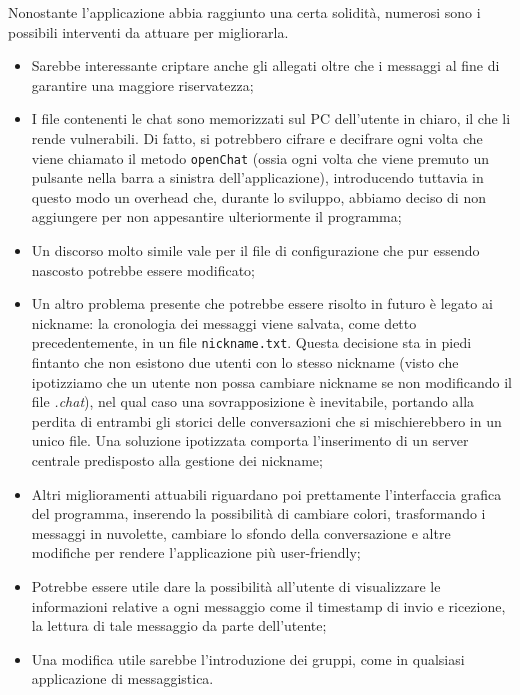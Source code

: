 Nonostante l'applicazione abbia raggiunto una certa solidità,
numerosi sono i possibili interventi da attuare per migliorarla.
\begin{itemize}
	\item Sarebbe interessante criptare anche gli allegati oltre che i
	messaggi al fine di garantire una maggiore riservatezza;
	\item I file contenenti le chat sono memorizzati sul PC
	dell'utente in chiaro, il che li rende vulnerabili. Di fatto, si potrebbero cifrare e decifrare ogni volta che 	
	viene chiamato il metodo \texttt{openChat} (ossia ogni volta che viene premuto un pulsante nella barra a 
	sinistra dell'applicazione), introducendo tuttavia in questo modo un overhead che, durante lo sviluppo, abbiamo
	deciso di non aggiungere per non appesantire ulteriormente il programma;
	\item Un discorso molto simile vale per il file di configurazione che pur essendo nascosto potrebbe essere 
	modificato;
	\item Un altro problema presente che potrebbe essere risolto in futuro è legato ai nickname: la cronologia dei 
	messaggi viene salvata, come detto precedentemente, in un file \texttt{nickname.txt}. Questa decisione sta 
	in piedi fintanto che non esistono due utenti con lo stesso nickname (visto che ipotizziamo che un utente non 
	possa cambiare nickname se non modificando il file \emph{.chat}), nel qual caso una sovrapposizione è 
	inevitabile, portando alla perdita di entrambi gli storici delle conversazioni che si mischierebbero in un unico 
	file. Una soluzione ipotizzata comporta l'inserimento di un server centrale predisposto alla gestione dei 
	nickname;
	\item Altri miglioramenti attuabili riguardano poi prettamente l'interfaccia grafica del programma, inserendo la 
	possibilità di cambiare colori, trasformando i messaggi in nuvolette, cambiare lo sfondo della conversazione e 
	altre modifiche per rendere l'applicazione più user-friendly;
	\item Potrebbe essere utile dare la possibilità all'utente di visualizzare le informazioni relative a ogni 
	messaggio come il timestamp di invio e ricezione, la lettura di tale messaggio da parte dell'utente;
	\item Una modifica utile sarebbe l'introduzione dei gruppi, come in qualsiasi applicazione di messaggistica.
\end{itemize}